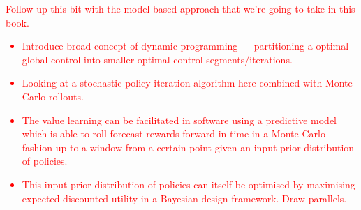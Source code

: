 \textcolor{red}{
Follow-up this bit with the model-based approach that we're going to take in this book.
\begin{itemize}
\item{Introduce broad concept of dynamic programming --- partitioning a optimal global control into smaller optimal control segments/iterations.}
\item{Looking at a stochastic policy iteration algorithm here combined with Monte Carlo rollouts.}
\item{The value learning can be facilitated in software using a predictive model which is able to roll forecast rewards forward in time in a Monte Carlo fashion up to a window from a certain point given an input prior distribution of policies.}
\item{This input prior distribution of policies can itself be optimised by maximising expected discounted utility in a Bayesian design framework. Draw parallels.}
\end{itemize}
}